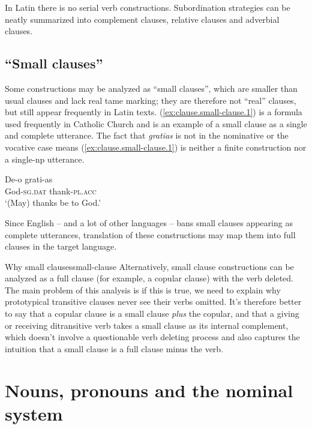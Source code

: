 \documentclass[a4paper, oneside, 12pt]{report}
\newcommand{\form}[1]{\emph{#1}}
\newcommand*{\category}[1]{\textsc{#1}}
\newcommand{\translate}[1]{`#1'}
\begin{document}
In Latin there is no serial verb constructions.
Subordination strategies can be neatly summarized into 
complement clauses, relative clauses and adverbial clauses.

\subsection{``Small clauses''}

Some constructions may be analyzed as ``small clauses'', 
which are smaller than usual clauses 
and lack real \acs{tame} marking;
they are therefore not ``real'' clauses, 
but still appear frequently in Latin texts.
(\ref{ex:clause.small-clause.1}) is a formula used frequently in Catholic Church 
and is an example of a small clause 
as a single and complete utterance.
The fact that \form{gratias} is not in the nominative or the vocative case 
means (\ref{ex:clause.small-clause.1}) is 
neither a finite construction nor a single-\acs{np} utterance.


\begin{exe}
    \ex \gll De-o grati-as \\
    God-\category{sg}.\category{dat} thank-\category{pl}.\category{acc} \\
    \glt \translate{(May) thanks be to God.}
    \label{ex:clause.small-clause.1}
\end{exe}

Since English -- and a lot of other languages -- 
bans small clauses appearing as complete utterances,
translation of these constructions may map them into full clauses in the target language. 

\begin{infobox}{Why small clauses}{small-clause}
    Alternatively, small clause constructions can be analyzed 
    as a full clause (for example, a copular clause) with the verb deleted.
    The main problem of this analysis is if this is true, 
    we need to explain why prototypical transitive clauses 
    never see their verbs omitted.
    It's therefore better to say 
    that a copular clause is a small clause \emph{plus} the copular,
    and that a giving or receiving ditransitive verb 
    takes a small clause as its internal complement,
    which doesn't involve a questionable verb deleting process
    and also captures the intuition that 
    a small clause is a full clause minus the verb.
\end{infobox}



\section{Nouns, pronouns and the nominal system}
\end{document}
